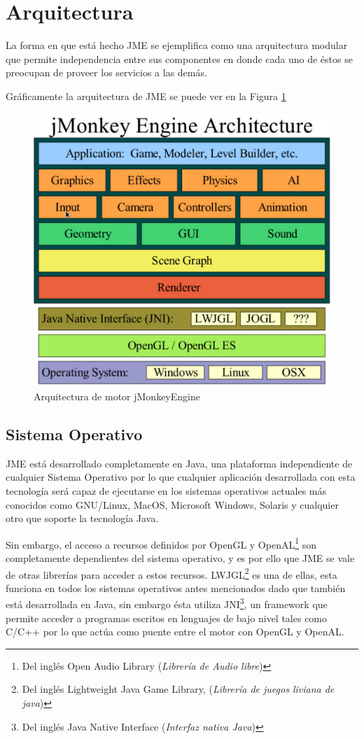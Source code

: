 \documentclass[a4paper,12pt,openany,oneside]{book}
\begin{document}
\section{Arquitectura}
La forma en que está hecho JME se ejemplifica como una arquitectura modular que permite independencia entre sus componentes en donde cada uno de éstos se preocupan de proveer los servicios a las demás. 

Gráficamente la arquitectura de JME se puede ver en la Figura \ref{archjme}
\begin{figure}[!hbp]
\begin{center}
\includegraphics[scale=0.6]{arquitectura.pdf}
\caption{Arquitectura de motor jMonkeyEngine}
\label{archjme}
\end{center}
\end{figure}
\subsection{Sistema Operativo}
JME está desarrollado completamente en Java, una plataforma independiente de cualquier Sistema Operativo por lo que cualquier aplicación desarrollada con esta tecnología será capaz de ejecutarse en los sistemas operativos actuales más conocidos como GNU/Linux, MacOS, Microsoft Windows, Solaris y cualquier otro que soporte la tecnología Java. 

Sin embargo, el acceso a recursos definidos por OpenGL y OpenAL\footnote{Del inglés Open Audio Library (\textit{Librería de Audio libre})} son completamente dependientes del sistema operativo, y es por ello que JME se vale de otras librerías para acceder a estos recursos. LWJGL\footnote{Del inglés Lightweight Java Game Library, (\textit{Librería de juegos liviana de java})} es una de ellas, esta funciona en todos los sistemas operativos antes mencionados dado que también está desarrollada en Java, sin embargo ésta utiliza JNI\footnote{Del inglés Java Native Interface (\textit{Interfaz nativa Java})}, un framework que permite acceder a programas escritos en lenguajes de bajo nivel tales como C/C++ por lo que actúa como puente entre el motor con OpenGL y OpenAL.
\end{document}
